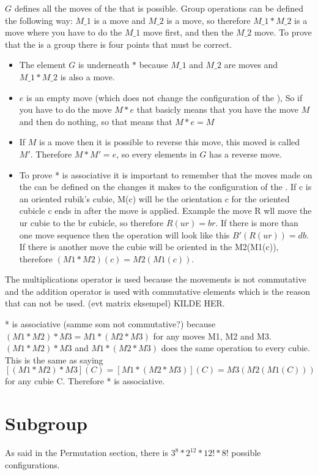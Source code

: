 $G$ defines all the moves of the \rubik{} that is possible. Group operations can be defined the following way: $M\_1$ is a move and $M\_2$ is a move, so therefore $M\_1 * M\_2$ is a move where you have to do the $M\_1$ move first, and then the $M\_2$ move. To prove that the \rubik{} is a group there is four points that must be correct.

\begin {itemize}
\item The element $G$ is underneath $*$ because $M\_1$ and $M\_2$ are moves  and $M\_1 * M\_2$ is also a move.

\item $e$ is an empty move (which does not change the configuration of the \rubik{}), So if you have to do the move $M * e$ that basicly means that you have the move $M$ and then do nothing, so that means that $M*e=M$

\item If $M$ is a move then it is possible to reverse this move, this moved is called $M'$. Therefore $M*M' = e$, so every elements in $G$ has a reverse move.

\item To prove * is associative it is important to remember that the moves made on the \rubik{} can be defined on the changes it makes to the configuration of the \rubik{}. 
If c is an oriented rubik's cubie, M(c) will be the orientation c for the oriented cubicle c ends in after the move is applied.
Example the move R wll move the ur cubie to the br cubicle, so therefore $R(ur)=br$. If there is more than one move sequence then the operation will look like this $B'(R(ur))=db$. If there is another move the cubie will be oriented in the M2(M1(c)), therefore $(M1*M2)(c)=M2(M1(c))$. 

\end {itemize}

The multiplications operator is used because the \rubik{} movements is not commutative and the addition operator is used with commutative elements which is the reason that can not be used. (evt matrix eksempel) KILDE HER.

* is associative (samme som not commutative?) because $(M1*M2)*M3 = M1*(M2*M3)$ for any moves M1, M2 and M3. $(M1*M2)*M3$ and $M1*(M2*M3)$ does the same operation to every cubie. This is the same as saying $[(M1*M2)*M3](C)=[M1*(M2*M3)](C)=M3(M2(M1(C)))$ for any cubie C. Therefore * is associative.

\section{Subgroup}
As said in the Permutation section, there is $3^8*2^{12}*12!*8!$ possible configurations.




